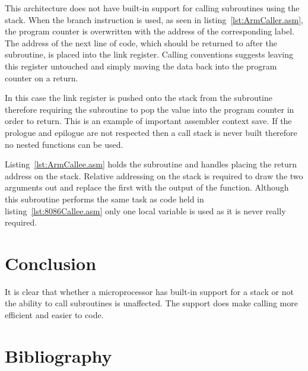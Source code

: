 \documentclass[12pt,a4paper]{article}
\begin{document}
This architecture does not have built-in support for calling subroutines using the stack.
When the branch instruction is used, as seen in listing~\ref{lst:ArmCaller.asm}, the program counter is overwritten with the address of the corresponding label.
The address of the next line of code, which should be returned to after the subroutine, is placed into the link register.
Calling conventions suggests leaving this register untouched and simply moving the data back into the program counter on a return.



In this case the link register is pushed onto the stack from the subroutine therefore requiring the subroutine to pop the value into the program counter in order to return.
This is an example of important assembler context save.
If the prologue and epilogue are not respected then a call stack is never built therefore no nested functions can be used.

Listing~\ref{lst:ArmCallee.asm} holds the subroutine and handles placing the return address on the stack.
Relative addressing on the stack is required to draw the two arguments out and replace the first with the output of the function.
Although this subroutine performs the same task as code held in listing~\ref{lst:8086Callee.asm} only one local variable is used as it is never really required.







\section{Conclusion}

It is clear that whether a microprocessor has built-in support for a stack or not the ability to call subroutines is unaffected.
The support does make calling more efficient and easier to code. 

\newpage




\makeatletter 
	\renewcommand\@biblabel[1]{\textbullet}
\makeatother

\section*{Bibliography}
\end{document}

